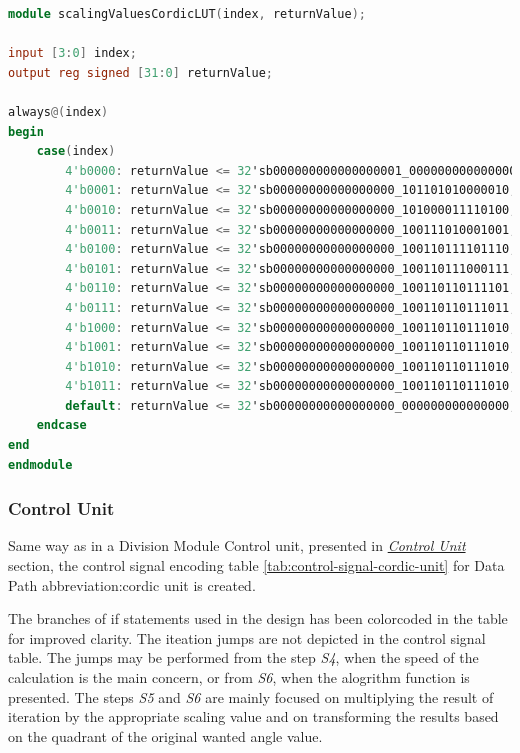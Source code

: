 \documentclass[a4paper, twoside, 11pt]{article}
\newcommand{\fbar}{\FloatBarrier}
\begin{document}
            \begin{lstlisting}[language={verilog}, caption={Verilog code of the scalingValuesCordicLUT lookup table (\gls{abbreviation:lut}) implementation.}, label= {lst:scalingValuesCordicLUT}]
module scalingValuesCordicLUT(index, returnValue);

input [3:0] index;
output reg signed [31:0] returnValue;

always@(index)
begin
    case(index)
        4'b0000: returnValue <= 32'sb000000000000000001_000000000000000; // 1
        4'b0001: returnValue <= 32'sb00000000000000000_101101010000010; // 0.7071067811865476
        4'b0010: returnValue <= 32'sb00000000000000000_101000011110100; // 0.6324555320336759
        4'b0011: returnValue <= 32'sb00000000000000000_100111010001001; // 0.6135719910778964
        4'b0100: returnValue <= 32'sb00000000000000000_100110111101110; // 0.6088339125177524
        4'b0101: returnValue <= 32'sb00000000000000000_100110111000111; // 0.6088339125177524
        4'b0110: returnValue <= 32'sb00000000000000000_100110110111101; // 0.607351770141296
        4'b0111: returnValue <= 32'sb00000000000000000_100110110111011; // 0.6072776440935261
        4'b1000: returnValue <= 32'sb00000000000000000_100110110111010; // 0.6072591122988928
        4'b1001: returnValue <= 32'sb00000000000000000_100110110111010; // 0.6072544793325625
        4'b1010: returnValue <= 32'sb00000000000000000_100110110111010; // 0.6072533210898753
        4'b1011: returnValue <= 32'sb00000000000000000_100110110111010; // 0.6072530315291345
        default: returnValue <= 32'sb00000000000000000_000000000000000; // 0
    endcase
end
endmodule\end{lstlisting}
        \fbar
        \subsubsection{Control Unit}\label{subsubsec:cordic-control-unit}
        Same way as in a Division Module Control unit, presented in \hyperref[subsubsec:division-control-unit]{\textit{Control Unit}} section, the control signal encoding table \ref{tab:control-signal-cordic-unit} for Data Path \gls{abbreviation:cordic} unit is created.\par
        The branches of if statements used in the design has been colorcoded in the table for improved clarity. The iteation jumps are not depicted in the control signal table. The jumps may be performed from the step \textit{S4}, when the speed of the calculation is the main concern, or from \textit{S6}, when the alogrithm function is presented. The steps \textit{S5} and \textit{S6} are mainly focused on multiplying the result of iteration by the appropriate scaling value and on transforming the results based on the quadrant of the original wanted angle value.
        
\end{document}
